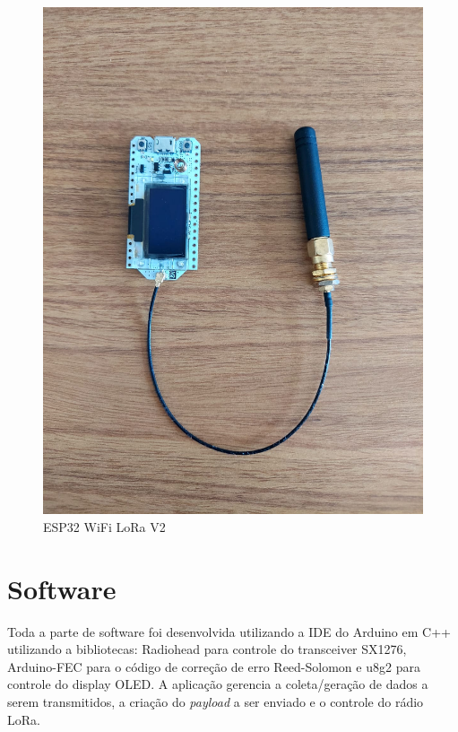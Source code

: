 \documentclass[
	12pt,				%
	openright,			%
	twoside,			%
	a4paper,			%
	english,			%
	french,				%
	spanish,			%
	brazil				%
	]{abntex2}
\begin{document}
\begin{figure}[H]
	\caption{\label{fig:HW}ESP32 WiFi LoRa V2}
	\begin{center}
	    \includegraphics[scale=0.25]{img/HW.jpg}
	\end{center}
\end{figure}

\section{Software}

Toda a parte de software foi desenvolvida utilizando a IDE do Arduino em C++ utilizando a bibliotecas: Radiohead para controle do transceiver SX1276, Arduino-FEC para o código de correção de erro Reed-Solomon e u8g2 para controle do display OLED. A aplicação gerencia a coleta/geração de dados a serem transmitidos, a criação do \emph{payload} a ser enviado e o controle do rádio LoRa.
\end{document}
